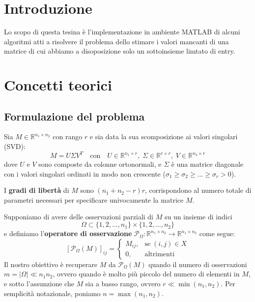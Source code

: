 \documentclass[12pt,a4paper]{report}
\begin{document}

\chapter{Introduzione}

Lo scopo di questa tesina è l'implementazione in ambiente MATLAB di alcuni algoritmi
atti a risolvere il problema dello stimare i valori mancanti di una matrice di cui
abbiamo a disoposizione solo un sottoinsieme limtato di entry.

{\let\clearpage\relax\chapter{Concetti teorici}}

\section{Formulazione del problema}

Sia $M\in\mathbb{R}^{n_1\times n_2}$ con rango $r$ e sia data la sua scomposizione ai valori
singolari (SVD):
$$M=U\Sigma V^T \quad\text{con}\quad U\in\mathbb{R}^{n_1\times r},
\;\Sigma\in\mathbb{R}^{r\times r},\;V\in\mathbb{R}^{n_2\times r}$$
dove $U$ e $V$ sono composte da colonne ortonormali, e $\Sigma$ è una matrice
diagonale con i valori singolari ordinati in modo non crescente
($\sigma_1\geq\sigma_2\geq\ldots\geq\sigma_r>0$).

I \textbf{gradi di libertà} di $M$ sono $(n_1 + n_2 - r)r$, corrispondono al numero totale di parametri
necessari per specificare univocamente la matrice $M$.

\newpage

Supponiamo di avere delle osservazioni parziali di $M$ su un insieme di indici
$$\Omega \subset \{1,2,\ldots,n_1\}\times\{1,2,\ldots,n_2\}$$
e definiamo l'\textbf{operatore di osservazione}
$\mathcal{P}_{\Omega}:\mathbb{R}^{n_1\times n_2}\to\mathbb{R}^{n_1\times n_2}$ come segue:
$$\left[\mathcal{P}_{\Omega}(M)\right] _{ij}=\left\{\begin{matrix}M_{ij}, & \text{se}\; (i,j)\in X \\ 0, & \text{altrimenti}\end{matrix}\right.$$
Il nostro obiettivo è recuperare $M$ da $\mathcal{P}_{\Omega}(M)$
quando il numero di osservazioni\\ $m = |\Omega| \ll n_1 n_2$, ovvero quando
è molto più piccolo del numero di elementi in $M$, e sotto l'assunzione che $M$
sia a basso rango, ovvero $r\ll\min(n_1,n_2)$.
Per semplicità notazionale, poniamo $n=\max(n_1,n_2)$.
\end{document}

